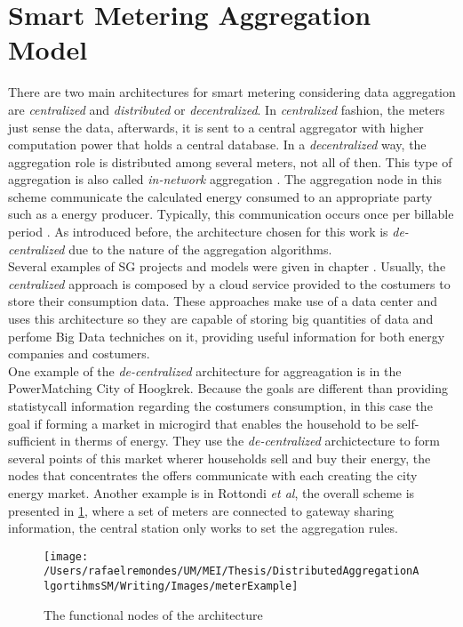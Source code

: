\section{Smart Metering Aggregation Model} 
There are two main architectures for smart metering considering data aggregation  are \textit{centralized} and \textit{distributed} or \textit{ decentralized}\cite{journals/spm/ErkinTLP13}. In \textit{centralized} fashion, the meters just sense the data, afterwards, it is sent to a central aggregator with higher computation power that holds a central database. In a \textit{decentralized} way, the aggregation role is distributed among several meters, not all of then. This type of aggregation is also called  \textit{in-network} aggregation \cite{Girao2004c}\cite{Castelluccia05efficientaggregation}. The aggregation node in this scheme communicate the calculated energy consumed to an appropriate party such as a energy producer. Typically, this communication occurs once per billable period \cite{journals/spm/ErkinTLP13}. As introduced before, the architecture chosen for this work is \textit{de-centralized} due to the nature of the aggregation algorithms.\\
Several examples of SG projects and models were given in chapter \cite{chap:sg}. Usually, the \textit{centralized} approach is composed by a cloud service provided to the costumers to store their consumption data. These approaches make use of a data center and uses this architecture so they are capable of storing  big quantities of data and perfome Big Data techniches on it, providing useful information for both energy companies and costumers. \\
One example of the \textit{de-centralized} architecture for aggreagation is in the PowerMatching City of Hoogkrek. Because the goals are different than providing statistycall information regarding the costumers consumption, in this case the goal if forming a market in microgird that enables the household to be self-sufficient in therms of energy. They use the \textit{de-centralized} archictecture to form several points of this market wherer households sell and buy their energy, the nodes that concentrates the offers communicate with each creating  the city energy market. Another example is in Rottondi  \textit{et al}\cite{rottondi2012}, the overall scheme is presented in \ref{fig:meterArchitecture}, where a set of meters are connected to gateway sharing information, the central station only works to set the aggregation rules.
\begin{figure}[h]
\centering
\texttt{[image: /Users/rafaelremondes/UM/MEI/Thesis/DistributedAggregationAlgortihmsSM/Writing/Images/meterExample]}
\caption{\label{fig:meterArchitecture} The functional nodes of the architecture}
\end{figure}




